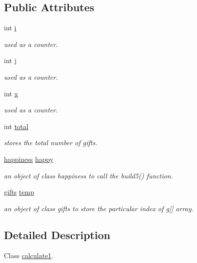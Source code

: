 \subsection*{Public Attributes}
\begin{DoxyCompactItemize}
\item 
int \hyperlink{classcalculate1_a6c68dd6750f04dae1b04326d738d35f8}{i}
\begin{DoxyCompactList}\small\item\em used as a counter. \end{DoxyCompactList}\item 
int \hyperlink{classcalculate1_a1752f176114621a7780697a522214247}{j}
\begin{DoxyCompactList}\small\item\em used as a counter. \end{DoxyCompactList}\item 
int \hyperlink{classcalculate1_a916258c23d9b3d08d35f3e86f706446b}{x}
\begin{DoxyCompactList}\small\item\em used as a counter. \end{DoxyCompactList}\item 
int \hyperlink{classcalculate1_a5fe4e73a325db65eea1b6d1579377f53}{total}
\begin{DoxyCompactList}\small\item\em stores the total number of gifts. \end{DoxyCompactList}\item 
\hyperlink{classhappiness}{happiness} \hyperlink{classcalculate1_a15010e309edd752d0e427b8e16e0a6da}{happy}
\begin{DoxyCompactList}\small\item\em an object of class happiness to call the build5() function. \end{DoxyCompactList}\item 
\hyperlink{classgifts}{gifts} \hyperlink{classcalculate1_a38238b9c563352dc041e3cc0f171d3e9}{temp}
\begin{DoxyCompactList}\small\item\em an object of class gifts to store the particular index of g\mbox{[}\mbox{]} array. \end{DoxyCompactList}\end{DoxyCompactItemize}


\subsection{Detailed Description}
Class \hyperlink{classcalculate1}{calculate1}. 

